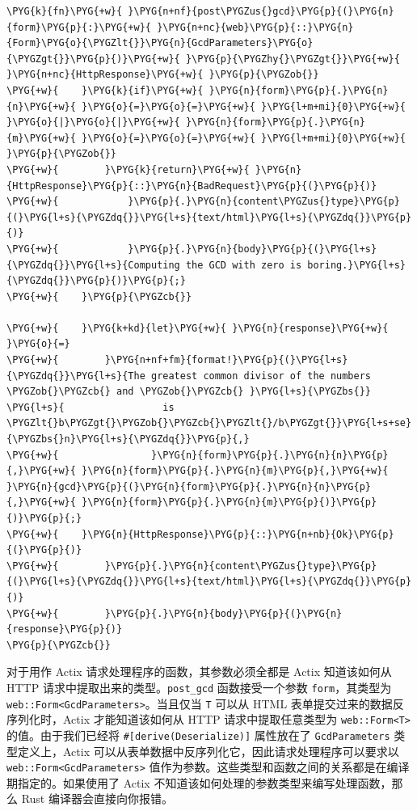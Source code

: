 \begin{Verbatim}[commandchars=\\\{\},breaklines=true,breakanywhere=true,fontsize=\codefont,xleftmargin=17bp]
\PYG{k}{fn}\PYG{+w}{ }\PYG{n+nf}{post\PYGZus{}gcd}\PYG{p}{(}\PYG{n}{form}\PYG{p}{:}\PYG{+w}{ }\PYG{n+nc}{web}\PYG{p}{::}\PYG{n}{Form}\PYG{o}{\PYGZlt{}}\PYG{n}{GcdParameters}\PYG{o}{\PYGZgt{}}\PYG{p}{)}\PYG{+w}{ }\PYG{p}{\PYGZhy{}\PYGZgt{}}\PYG{+w}{ }\PYG{n+nc}{HttpResponse}\PYG{+w}{ }\PYG{p}{\PYGZob{}}
\PYG{+w}{    }\PYG{k}{if}\PYG{+w}{ }\PYG{n}{form}\PYG{p}{.}\PYG{n}{n}\PYG{+w}{ }\PYG{o}{=}\PYG{o}{=}\PYG{+w}{ }\PYG{l+m+mi}{0}\PYG{+w}{ }\PYG{o}{|}\PYG{o}{|}\PYG{+w}{ }\PYG{n}{form}\PYG{p}{.}\PYG{n}{m}\PYG{+w}{ }\PYG{o}{=}\PYG{o}{=}\PYG{+w}{ }\PYG{l+m+mi}{0}\PYG{+w}{ }\PYG{p}{\PYGZob{}}
\PYG{+w}{        }\PYG{k}{return}\PYG{+w}{ }\PYG{n}{HttpResponse}\PYG{p}{::}\PYG{n}{BadRequest}\PYG{p}{(}\PYG{p}{)}
\PYG{+w}{            }\PYG{p}{.}\PYG{n}{content\PYGZus{}type}\PYG{p}{(}\PYG{l+s}{\PYGZdq{}}\PYG{l+s}{text/html}\PYG{l+s}{\PYGZdq{}}\PYG{p}{)}
\PYG{+w}{            }\PYG{p}{.}\PYG{n}{body}\PYG{p}{(}\PYG{l+s}{\PYGZdq{}}\PYG{l+s}{Computing the GCD with zero is boring.}\PYG{l+s}{\PYGZdq{}}\PYG{p}{)}\PYG{p}{;}
\PYG{+w}{    }\PYG{p}{\PYGZcb{}}

\PYG{+w}{    }\PYG{k+kd}{let}\PYG{+w}{ }\PYG{n}{response}\PYG{+w}{ }\PYG{o}{=}
\PYG{+w}{        }\PYG{n+nf+fm}{format!}\PYG{p}{(}\PYG{l+s}{\PYGZdq{}}\PYG{l+s}{The greatest common divisor of the numbers \PYGZob{}\PYGZcb{} and \PYGZob{}\PYGZcb{} }\PYG{l+s}{\PYGZbs{}}
\PYG{l+s}{                 is \PYGZlt{}b\PYGZgt{}\PYGZob{}\PYGZcb{}\PYGZlt{}/b\PYGZgt{}}\PYG{l+s+se}{\PYGZbs{}n}\PYG{l+s}{\PYGZdq{}}\PYG{p}{,}
\PYG{+w}{                }\PYG{n}{form}\PYG{p}{.}\PYG{n}{n}\PYG{p}{,}\PYG{+w}{ }\PYG{n}{form}\PYG{p}{.}\PYG{n}{m}\PYG{p}{,}\PYG{+w}{ }\PYG{n}{gcd}\PYG{p}{(}\PYG{n}{form}\PYG{p}{.}\PYG{n}{n}\PYG{p}{,}\PYG{+w}{ }\PYG{n}{form}\PYG{p}{.}\PYG{n}{m}\PYG{p}{)}\PYG{p}{)}\PYG{p}{;}
\PYG{+w}{    }\PYG{n}{HttpResponse}\PYG{p}{::}\PYG{n+nb}{Ok}\PYG{p}{(}\PYG{p}{)}
\PYG{+w}{        }\PYG{p}{.}\PYG{n}{content\PYGZus{}type}\PYG{p}{(}\PYG{l+s}{\PYGZdq{}}\PYG{l+s}{text/html}\PYG{l+s}{\PYGZdq{}}\PYG{p}{)}
\PYG{+w}{        }\PYG{p}{.}\PYG{n}{body}\PYG{p}{(}\PYG{n}{response}\PYG{p}{)}
\PYG{p}{\PYGZcb{}}
\end{Verbatim}

对于用作 Actix 请求处理程序的函数，其参数必须全都是 Actix 知道该如何从 HTTP 请求中提取出来的类型。\texttt{post\_gcd} 函数接受一个参数 \texttt{form}，其类型为 \texttt{web::Form<GcdParameters>}。当且仅当 \texttt{T} 可以从 HTML 表单提交过来的数据反序列化时，Actix 才能知道该如何从 HTTP 请求中提取任意类型为 \texttt{web::Form<T>} 的值。由于我们已经将 \texttt{\#[derive(Deserialize)]} 属性放在了 \texttt{GcdParameters} 类型定义上，Actix 可以从表单数据中反序列化它，因此请求处理程序可以要求以 \texttt{web::Form<GcdParameters>} 值作为参数。这些类型和函数之间的关系都是在编译期指定的。如果使用了 Actix 不知道该如何处理的参数类型来编写处理函数，那么 Rust 编译器会直接向你报错。

